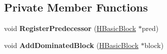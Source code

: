 \subsection*{Private Member Functions}
\begin{DoxyCompactItemize}
\item 
void {\bfseries Register\+Predecessor} (\hyperlink{classv8_1_1internal_1_1_h_basic_block}{H\+Basic\+Block} $\ast$pred)\hypertarget{classv8_1_1internal_1_1_h_basic_block_a760528605d06935ae34d5369882996ac}{}\label{classv8_1_1internal_1_1_h_basic_block_a760528605d06935ae34d5369882996ac}

\item 
void {\bfseries Add\+Dominated\+Block} (\hyperlink{classv8_1_1internal_1_1_h_basic_block}{H\+Basic\+Block} $\ast$block)\hypertarget{classv8_1_1internal_1_1_h_basic_block_acf938f9845e3b2265dc5d40921c96576}{}\label{classv8_1_1internal_1_1_h_basic_block_acf938f9845e3b2265dc5d40921c96576}

\end{DoxyCompactItemize}
